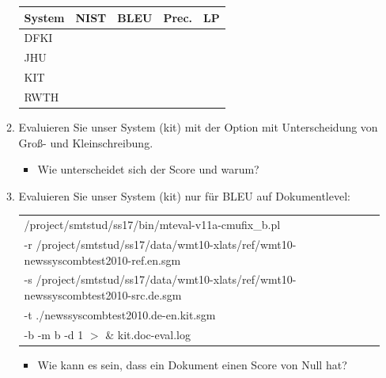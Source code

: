 \documentclass[12pt,fleqn]{article}
\begin{document}
\begin{enumerate}
\begin{enumerate}
\begin{table}[h] 
 \begin{center} 
\begin{tabular}{|p{2cm}|p{2.5cm}|p{2.5cm}|p{2.5cm}|p{2.5cm}|} \hline 
 System & NIST & BLEU & Prec. & LP \\  \hline 
DFKI & & & & \\ \hline 
JHU & & & & \\ \hline 
KIT & & & & \\ \hline 
RWTH & & & & \\ \hline 
\end{tabular}
 \end{center}
\end{table}

\vspace{0.5cm} 
\item Evaluieren Sie unser System (kit) mit der Option mit Unterscheidung von Groß- und Kleinschreibung.

\vspace{0.5cm} 
\begin{itemize} 
\item Wie unterscheidet sich der Score und warum?
\end{itemize} 

\vspace{0.5cm} 
\item Evaluieren Sie unser System (kit) nur für BLEU auf Dokumentlevel:

\begin{table}[h] 
 \begin{center} 
\begin{tabular}{l} 
/project/smtstud/ss17/bin/mteval-v11a-cmufix\_b.pl  \\ 
-r /project/smtstud/ss17/data/wmt10-xlats/ref/wmt10-newssyscombtest2010-ref.en.sgm  \\ 
-s /project/smtstud/ss17/data/wmt10-xlats/ref/wmt10-newssyscombtest2010-src.de.sgm  \\ 
-t ./newssyscombtest2010.de-en.kit.sgm  \\ 
-b -m b -d 1    $>$ \&  kit.doc-eval.log \\ 
\end{tabular}
 \end{center}
\end{table}


\vspace{0.5cm} 
\begin{itemize} 
\item Wie kann es sein, dass ein Dokument einen Score von Null hat?
\end{itemize} 


\end{enumerate}
\end{enumerate}
\end{document}
